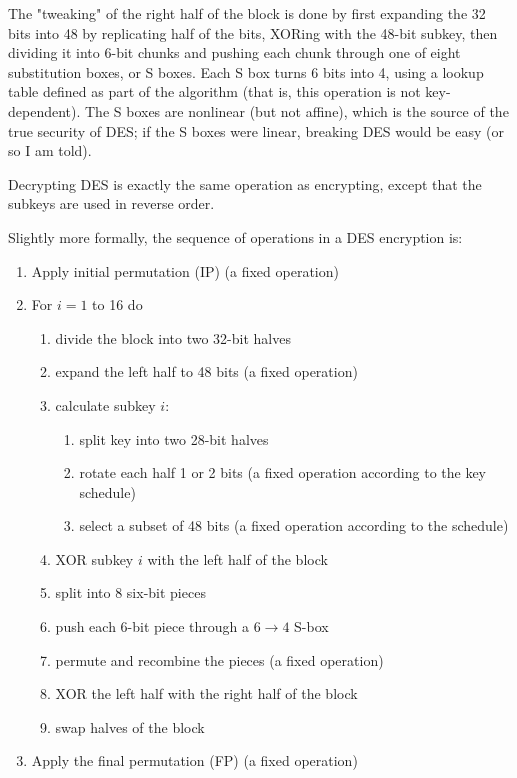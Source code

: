 \documentclass[%
 aip,
 jmp,%
 amsmath,amssymb,
 reprint,%
]{revtex4-1}
\begin{document}
The "tweaking" of the right half of the block is done by first
expanding the 32 bits into 48 by replicating half of the bits, XORing
with the 48-bit subkey, then dividing it into 6-bit chunks and pushing
each chunk through one of eight substitution boxes, or S boxes.  Each
S box turns 6 bits into 4, using a lookup table defined as part of the
algorithm (that is, this operation is not key-dependent).  The S boxes
are nonlinear (but not affine), which is the source of the true
security of DES; if the S boxes were linear, breaking DES would be
easy (or so I am told).

Decrypting DES is exactly the same operation as encrypting, except
that the subkeys are used in reverse order.

Slightly more formally, the sequence of operations in a DES encryption
is:

\begin{enumerate}
\item Apply initial permutation (IP) (a fixed operation)
\item For $i = 1$ to 16 do
  \begin{enumerate}
  \item divide the block into two 32-bit halves
  \item expand the left half to 48 bits (a fixed operation)
  \item calculate subkey $i$:
    \begin{enumerate}
    \item split key into two 28-bit halves
    \item rotate each half 1 or 2 bits (a fixed operation according to
      the key schedule)
    \item select a subset of 48 bits (a fixed operation according to
      the schedule)
    \end{enumerate}
  \item XOR subkey $i$ with the left half of the block
  \item split into 8 six-bit pieces
  \item push each 6-bit piece through a $6\rightarrow 4$ S-box
  \item permute and recombine the pieces (a fixed operation)
  \item XOR the left half with the right half of the block
  \item swap halves of the block
  \end{enumerate}
\item Apply the final permutation (FP) (a fixed operation)
\end{enumerate}
\end{document}
